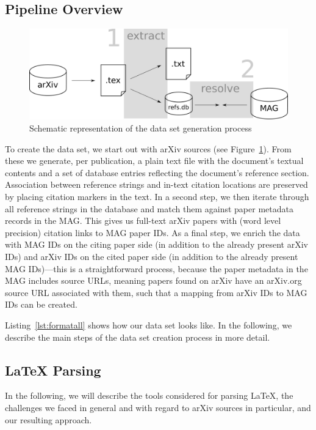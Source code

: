 \subsection{Pipeline Overview}

\begin{figure}[tb]
  \centering
    \includegraphics[width=.7\textwidth]{figures/corpus/Fig1.pdf}
  \caption{Schematic representation of the data set generation process}
  \label{fig:datagen}
\end{figure}

To create the data set, we start out with arXiv sources (see Figure~\ref{fig:datagen}). From these we generate, per publication, a plain text file with the document's textual contents and a set of database entries reflecting the document's reference section. Association between reference strings and in-text citation locations are preserved by placing citation markers in the text. In a second step, we then iterate through all reference strings in the database and match them against paper metadata records in the MAG. This gives us full-text arXiv papers with (word level precision) citation links to MAG paper IDs. As a final step, we enrich the data with MAG IDs on the citing paper side (in addition to the already present arXiv IDs) and arXiv IDs on the cited paper side (in addition to the already present MAG IDs)---this is a straightforward process, because the paper metadata in the MAG includes source URLs, meaning papers found on arXiv have an arXiv.org source URL associated with them, such that a mapping from arXiv IDs to MAG IDs can be created.

Listing~\ref{lst:formatall} shows how our data set looks like. In the following, we describe the main steps of the data set creation process in more detail.

\subsection{\LaTeX{} Parsing}
In the following, we will describe the tools considered for parsing \LaTeX{}, the challenges we faced in general and with regard to arXiv sources in particular, and our resulting approach.

